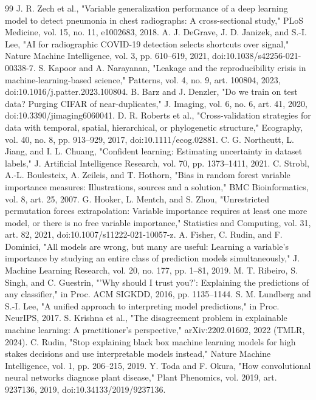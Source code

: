 \documentclass[conference]{IEEEtran}
\begin{document}
\begin{thebibliography}{99}
 J. R. Zech et al., "Variable generalization performance of a deep learning model to detect pneumonia in chest radiographs: A cross-sectional study," PLoS Medicine, vol. 15, no. 11, e1002683, 2018.
 A. J. DeGrave, J. D. Janizek, and S.-I. Lee, "AI for radiographic COVID-19 detection selects shortcuts over signal," Nature Machine Intelligence, vol. 3, pp. 610--619, 2021, doi:10.1038/s42256-021-00338-7.
 S. Kapoor and A. Narayanan, "Leakage and the reproducibility crisis in machine-learning-based science," Patterns, vol. 4, no. 9, art. 100804, 2023, doi:10.1016/j.patter.2023.100804.
 B. Barz and J. Denzler, "Do we train on test data? Purging CIFAR of near-duplicates," J. Imaging, vol. 6, no. 6, art. 41, 2020, doi:10.3390/jimaging6060041.
 D. R. Roberts et al., "Cross-validation strategies for data with temporal, spatial, hierarchical, or phylogenetic structure," Ecography, vol. 40, no. 8, pp. 913--929, 2017, doi:10.1111/ecog.02881.
 C. G. Northcutt, L. Jiang, and I. L. Chuang, "Confident learning: Estimating uncertainty in dataset labels," J. Artificial Intelligence Research, vol. 70, pp. 1373--1411, 2021.
 C. Strobl, A.-L. Boulesteix, A. Zeileis, and T. Hothorn, "Bias in random forest variable importance measures: Illustrations, sources and a solution," BMC Bioinformatics, vol. 8, art. 25, 2007.
 G. Hooker, L. Mentch, and S. Zhou, "Unrestricted permutation forces extrapolation: Variable importance requires at least one more model, or there is no free variable importance," Statistics and Computing, vol. 31, art. 82, 2021, doi:10.1007/s11222-021-10057-z.
 A. Fisher, C. Rudin, and F. Dominici, "All models are wrong, but many are useful: Learning a variable's importance by studying an entire class of prediction models simultaneously," J. Machine Learning Research, vol. 20, no. 177, pp. 1--81, 2019.
 M. T. Ribeiro, S. Singh, and C. Guestrin, "'Why should I trust you?': Explaining the predictions of any classifier," in Proc. ACM SIGKDD, 2016, pp. 1135--1144.
 S. M. Lundberg and S.-I. Lee, "A unified approach to interpreting model predictions," in Proc. NeurIPS, 2017.
 S. Krishna et al., "The disagreement problem in explainable machine learning: A practitioner's perspective," arXiv:2202.01602, 2022 (TMLR, 2024).
 C. Rudin, "Stop explaining black box machine learning models for high stakes decisions and use interpretable models instead," Nature Machine Intelligence, vol. 1, pp. 206--215, 2019.
 Y. Toda and F. Okura, "How convolutional neural networks diagnose plant disease," Plant Phenomics, vol. 2019, art. 9237136, 2019, doi:10.34133/2019/9237136.

\end{thebibliography}
\end{document}
